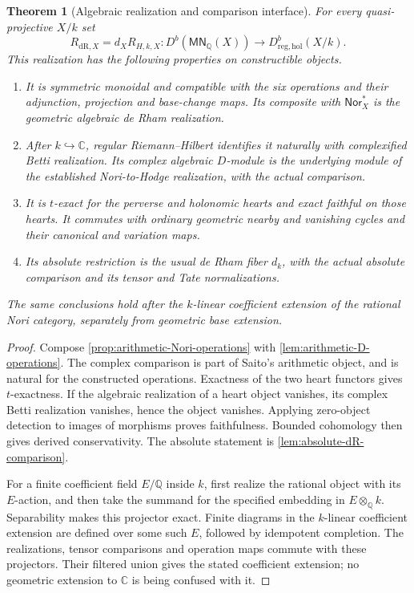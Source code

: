 \documentclass[11pt]{article}
\numberwithin{equation}{section}
\newtheorem{theorem}{Theorem}[section]
\theoremstyle{definition}
\theoremstyle{remark}
\newcommand{\Q}{\mathbb Q}
\newcommand{\C}{\mathbb C}
\newcommand{\MN}{\mathsf{MN}}
\newcommand{\dR}{\mathrm{dR}}
\begin{document}
\begin{theorem}[Algebraic realization and comparison interface]
\label{thm:algebraic-interface}
For every quasi-projective $X/k$ set
\begin{equation}\label{eq:relative-algebraic-realization}
 R_{\dR,X}=d_XR_{H,k,X}:D^b(\MN_\Q(X))
       \longrightarrow D^b_{\mathrm{reg,hol}}(X/k).
\end{equation}
This realization has the following properties on constructible objects.
\begin{enumerate}[label=\textup{(\roman*)},leftmargin=2.5em]
\item It is symmetric monoidal and compatible with the six operations
and their adjunction, projection and base-change maps. Its composite
with $\mathsf{Nor}_X^*$ is the geometric algebraic de Rham realization.
\item After $k\hookrightarrow\C$, regular Riemann--Hilbert identifies
it naturally with complexified Betti realization. Its complex algebraic
$D$-module is the underlying module of the established Nori-to-Hodge
realization, with the actual comparison.
\item It is $t$-exact for the perverse and holonomic hearts and exact
faithful on those hearts. It commutes with ordinary geometric nearby
and vanishing cycles and their canonical and variation maps.
\item Its absolute restriction is the usual de Rham fiber $d_k$, with
the actual absolute comparison and its tensor and Tate normalizations.
\end{enumerate}
The same conclusions hold after the $k$-linear coefficient extension
of the rational Nori category, separately from geometric base extension.
\end{theorem}
\begin{proof}
Compose \cref{prop:arithmetic-Nori-operations} with
\cref{lem:arithmetic-D-operations}. The complex comparison is part of
Saito's arithmetic object, and is natural for the constructed operations.
Exactness of the two heart functors gives $t$-exactness. If the algebraic
realization of a heart object vanishes, its complex Betti realization
vanishes, hence the object vanishes. Applying zero-object detection to
images of morphisms proves faithfulness. Bounded cohomology then gives
derived conservativity. The absolute statement is
\cref{lem:absolute-dR-comparison}.

For a finite coefficient field $E/\Q$ inside $k$, first realize the
rational object with its $E$-action, and then take the summand for the
specified embedding in $E\otimes_\Q k$. Separability makes this
projector exact. Finite diagrams in the $k$-linear coefficient extension
are defined over some such $E$, followed by idempotent completion.
The realizations, tensor comparisons and operation maps commute with
these projectors. Their filtered union gives the stated coefficient
extension; no geometric extension to $\C$ is being confused with it.
\end{proof}
\end{document}
